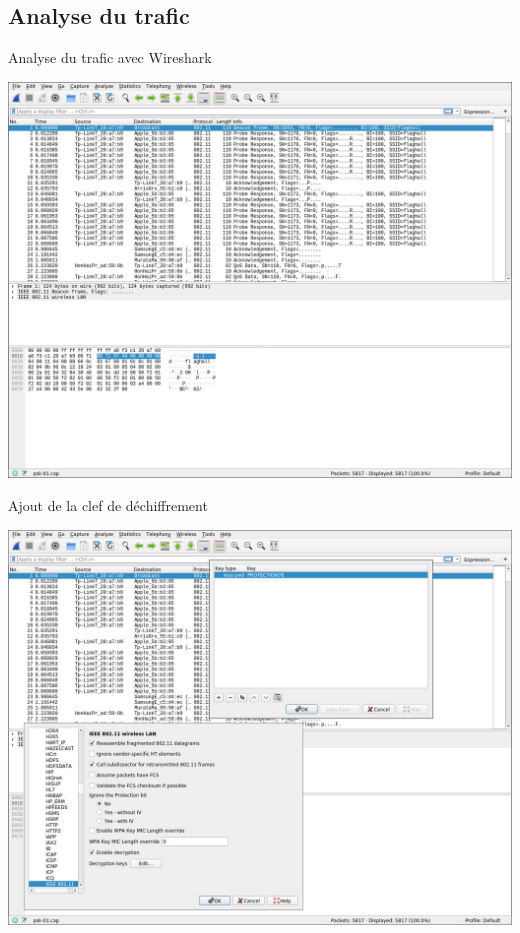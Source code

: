 \documentclass[10pt,sans,usenames,dvipsnames,french,compress]{beamer}
\begin{document}
\subsection{Analyse du trafic}
\begin{frame}{Analyse du trafic  avec Wireshark}
	\begin{center}
		\includegraphics[width=0.8\linewidth]{118/wireshark0}
	\end{center}
\end{frame}

\begin{frame}{Ajout de la clef de déchiffrement}
	\begin{center}
		\includegraphics[width=0.8\linewidth]{118/wireshark1}
	\end{center}
\end{frame}
\end{document}
